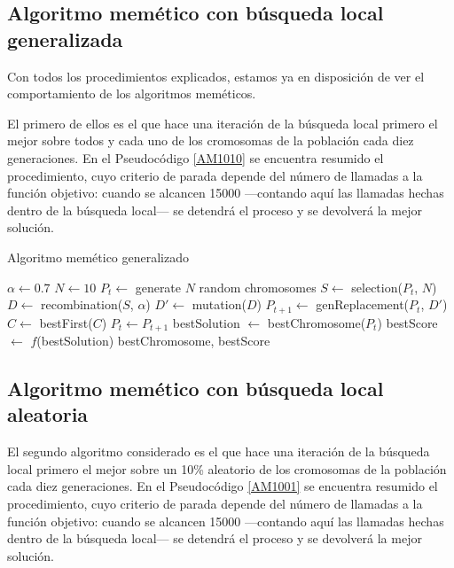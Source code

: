 \documentclass[a4paper, 11pt, titlepage]{article}
\begin{document}
    \subsection{Algoritmo memético con búsqueda local generalizada}

    Con todos los procedimientos explicados, estamos ya en disposición de ver el comportamiento de los algoritmos meméticos.

    El primero de ellos es el que hace una iteración de la búsqueda local primero el mejor sobre todos y cada uno de los cromosomas de la población cada diez generaciones. En el Pseudocódigo \ref{AM1010} se encuentra resumido el procedimiento, cuyo criterio de parada depende del número de llamadas a la función objetivo: cuando se alcancen 15000 ---contando aquí las llamadas hechas dentro de la búsqueda local--- se detendrá el proceso y se devolverá la mejor solución.

    \begin{algorithm}
        \caption{Algoritmo memético generalizado}\label{AM1010}
        \begin{algorithmic}[1]
            \State $\alpha \gets 0.7$ 
            \State $N \gets 10$ 
            \State $P_t \gets$ generate $N$ random chromosomes
                \State $S \gets$ selection($P_t$, $N$) 
                \State $D \gets$ recombination($S$, $\alpha$)
                \State $D' \gets$ mutation($D$)
                \State $P_{t+1} \gets$ genReplacement($P_t$, $D'$)
                    \State $C \gets$ bestFirst($C$)
                    \EndFor
                \EndIf
                \State $P_t \gets P_{t+1}$
            \EndWhile
            \State bestSolution $\gets$ bestChromosome($P_t$)
            \State bestScore $\gets$ $f$(bestSolution)
            \State \Return bestChromosome, bestScore
            \EndFunction
        \end{algorithmic}
    \end{algorithm}

    \subsection{Algoritmo memético con búsqueda local aleatoria}
    El segundo algoritmo considerado es el que hace una iteración de la búsqueda local primero el mejor sobre un 10\% aleatorio de los cromosomas de la población cada diez generaciones. En el Pseudocódigo \ref{AM1001} se encuentra resumido el procedimiento, cuyo criterio de parada depende del número de llamadas a la función objetivo: cuando se alcancen 15000 ---contando aquí las llamadas hechas dentro de la búsqueda local--- se detendrá el proceso y se devolverá la mejor solución.
\end{document}
